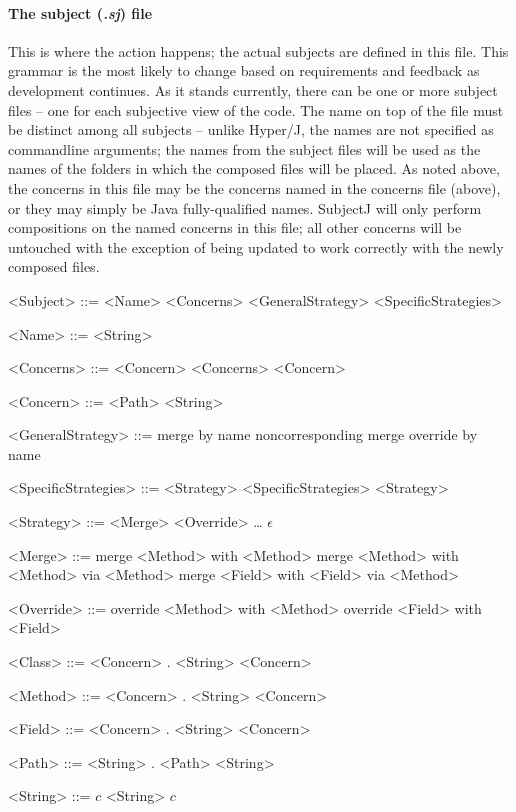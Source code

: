 \documentclass[11pt,letterpaper]{article}
\begin{document}
    \paragraph{The subject (\emph{.sj}) file}
    This is where the action happens; the actual subjects are defined in this file. This grammar is the most likely to change based on requirements and feedback as development continues. As it stands currently, there can be one or more subject files -- one for each subjective view of the code. The name on top of the file must be distinct among all subjects -- unlike Hyper/J, the names are not specified as commandline arguments; the names from the subject files will be used as the names of the folders in which the composed files will be placed. As noted above, the concerns in this file may be the concerns named in the concerns file (above), or they may simply be Java fully-qualified names. SubjectJ will only perform compositions on the named concerns in this file; all other concerns will be untouched with the exception of being updated to work correctly with the newly composed files.
    \begin{grammar}
        <Subject> ::= <Name> <Concerns> <GeneralStrategy> <SpecificStrategies>

        <Name> ::= <String>

        <Concerns> ::= <Concern> <Concerns>
        \alt <Concern>

        <Concern> ::= <Path>
        \alt <String>

        <GeneralStrategy> ::= merge by name
        \alt noncorresponding merge
        \alt override by name

        <SpecificStrategies> ::= <Strategy> <SpecificStrategies>
        \alt <Strategy>

        <Strategy> ::= <Merge>
        \alt <Override>
        \alt \ldots
        \alt $\epsilon$

        <Merge> ::= merge <Method> with <Method>
        \alt merge <Method> with <Method> via <Method>
        \alt merge <Field> with <Field> via <Method>

        <Override> ::= override <Method> with <Method>
        \alt override <Field> with <Field>

        <Class> ::= <Concern> . <String>
        \alt <Concern>

        <Method> ::= <Concern> . <String>
        \alt <Concern>

        <Field> ::= <Concern> . <String>
        \alt <Concern>

        <Path> ::= <String> . <Path>
        \alt <String>

        <String> ::= $c$ <String>
        \alt $c$
    \end{grammar}
\end{document}
